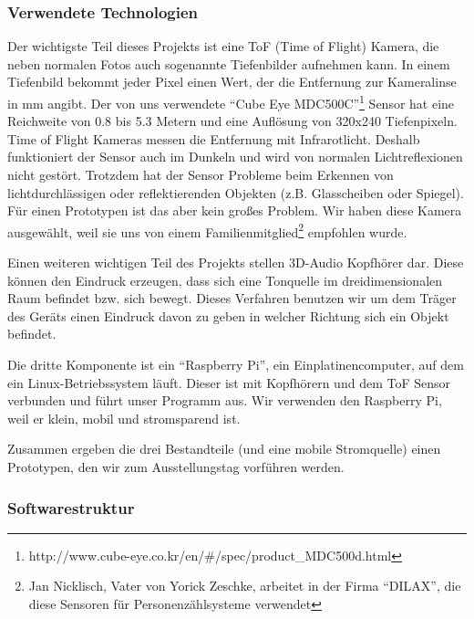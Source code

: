 \documentclass[a4paper,12pt,ngerman]{scrartcl}
\begin{document}
\subsubsection{Verwendete Technologien}

Der wichtigste Teil dieses Projekts ist eine ToF (Time of Flight) Kamera, die neben normalen Fotos 
auch sogenannte Tiefenbilder aufnehmen kann.
In einem Tiefenbild bekommt jeder Pixel einen Wert, der die Entfernung zur Kameralinse in mm angibt.
Der von uns verwendete \enquote{Cube Eye MDC500C}\footnote{http://www.cube-eye.co.kr/en/\#/spec/product\_MDC500d.html}
Sensor hat eine Reichweite von 0.8 bis 5.3 Metern und eine Auflösung von 320x240 Tiefenpixeln. 
Time of Flight Kameras messen die Entfernung mit Infrarotlicht. Deshalb funktioniert der Sensor auch 
im Dunkeln und wird von normalen Lichtreflexionen nicht gestört. Trotzdem hat der Sensor Probleme beim
Erkennen von lichtdurchlässigen oder reflektierenden Objekten (z.B. Glasscheiben oder Spiegel). Für einen
Prototypen ist das aber kein großes Problem. Wir haben diese Kamera ausgewählt, weil sie uns von einem 
Familienmitglied\footnote{Jan Nicklisch, Vater von Yorick Zeschke, arbeitet in der Firma
	\enquote{DILAX}, die diese Sensoren für Personenzählsysteme verwendet} 
empfohlen wurde.\par
Einen weiteren wichtigen Teil des Projekts stellen 3D-Audio Kopfhörer dar. Diese können den Eindruck
erzeugen, dass sich eine Tonquelle im dreidimensionalen
Raum befindet bzw. sich bewegt. Dieses Verfahren benutzen wir um dem Träger des Geräts einen Eindruck
davon zu geben in welcher Richtung sich ein Objekt befindet.\par 
Die dritte Komponente ist ein \enquote{Raspberry Pi}, ein 
Einplatinencomputer, auf dem ein Linux-Betriebssystem läuft. Dieser ist mit Kopfhörern und dem ToF Sensor 
verbunden und führt unser Programm aus. Wir verwenden den Raspberry Pi, weil er klein, mobil und 
stromsparend ist.\par 
Zusammen ergeben die drei Bestandteile (und eine mobile Stromquelle) einen Prototypen, den wir zum Ausstellungstag vorführen werden.

\subsubsection{Softwarestruktur}
\end{document}
